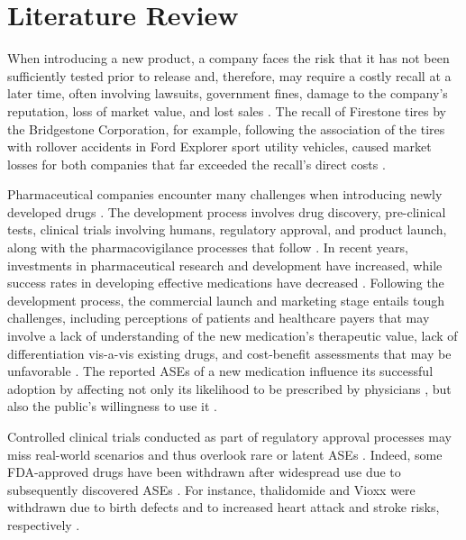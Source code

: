 \documentclass[referee,bst/sn-basic]{sn-jnl}%
\theoremstyle{thmstyletwo}%
\theoremstyle{thmstylethree}%
\begin{document}
\section{Literature Review}
\label{sec:LR}

When introducing a new product, a company faces the risk that it has not been sufficiently tested prior to release and, therefore, may require a costly recall at a later time, often involving lawsuits, government fines, damage to the company’s reputation, loss of market value, and lost sales  \cite{berman2021managing,govindaraj2004market}. 
The recall of Firestone tires by the Bridgestone Corporation, for example, following the association of the tires with rollover accidents in Ford Explorer sport utility vehicles, caused market losses for both companies that far exceeded the recall’s direct costs \cite{govindaraj2004market}.

Pharmaceutical companies encounter many challenges when introducing newly developed drugs \cite{marques2020decision}.
The development process involves drug discovery, pre-clinical tests, clinical trials involving humans, regulatory approval, and product launch, along with the pharmacovigilance processes that follow \cite{marques2020decision,lainez2012challenges}.
In recent years, investments in pharmaceutical research and development have increased, while success rates in developing effective  medications have decreased \cite{marques2020decision,wang2015racing}. 
Following the development process, the commercial launch and marketing stage entails tough challenges, including perceptions of patients and healthcare payers that may involve a lack of understanding of the new medication’s therapeutic value, lack of differentiation vis-a-vis existing drugs, and cost-benefit assessments that may be unfavorable \cite{marques2020decision}. 
The reported ASEs of a new medication influence its successful adoption by affecting not only its likelihood to be prescribed by physicians \cite{garjon2012adoption,lubloy2014factors}, but also the public’s willingness to use it \cite{vlasnik2005medication}.

Controlled clinical trials conducted as part of regulatory approval processes may miss real-world scenarios \cite{kim2012institutional} and thus overlook rare or latent ASEs \cite{berlin2008adverse}. 
Indeed, some FDA-approved drugs have been withdrawn after widespread use due to subsequently discovered ASEs \cite{ponrartana2021safety}. 
For instance, thalidomide and Vioxx were withdrawn due to birth defects and to increased heart attack and stroke risks, respectively \cite{ridings2013thalidomide}.
\end{document}
